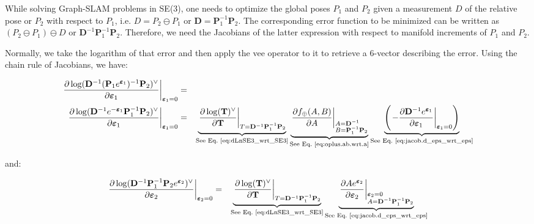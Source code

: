 \documentclass[a4paper,11pt]{report}
\newcommand{\E}{{\bm{\varepsilon}}}
\newcommand{\D}{{\mathbf{D}}}
\newcommand{\Pone}{\mathbf{P}_1}
\newcommand{\Ptwo}{\mathbf{P}_2}
\begin{document}
While solving Graph-SLAM problems in SE(3), one needs to optimize the global poses $P_1$ and $P_2$ given a measurement $D$ of the relative pose or $P_2$ with respect to $P_1$, i.e.  $D=P_2 \ominus P_1$ or $\D = \Pone^{-1} \Ptwo$.
The corresponding error function to be minimized can be written as $(P_2 \ominus P_1) \ominus D$ or $\D^{-1} \Pone^{-1} \Ptwo$.
Therefore, we need the Jacobians of the latter expression with respect to 
manifold increments of $P_1$ and $P_2$. 

Normally, we take the logarithm of that error and then apply the vee operator to it 
to retrieve a 6-vector describing the error. 
Using the chain rule of Jacobians, we have:

\begin{eqnarray}
\left. \frac{\partial \log( \D^{-1} (\Pone e^{\E_1} )^{-1} \Ptwo )^\vee}{\partial \E_1} \right|_{\E_1 = 0}
&=&
\nonumber \\
\left. \frac{\partial \log( \D^{-1} e^{-\E_1} \Pone^{-1} \Ptwo )^\vee}{\partial \E_1} \right|_{\E_1 = 0}
&=&
\underbrace{
\left.
 \frac{\partial \log(\mathbf{T})^\vee }{\partial \mathbf{T}}
\right|_{T=\D^{-1} \Pone^{-1} \Ptwo}
}_{\text{See Eq.~\ref{eq:dLnSE3_wrt_SE3}}}
%
\underbrace{
\left. \frac{\partial f_\oplus(A,B) }{\partial A } \right|_{\begin{subarray}{l} A=\D^{-1} \\ B=\Pone^{-1}\Ptwo \end{subarray}}
}_{\text{See Eq.~\ref{eq:oplus.ab.wrt.a}}}
%
\underbrace{
\left(
\left. - \frac{\partial \D^{-1} e^{\E_1} }{\partial \E_1} \right|_{\E_1 = 0}
\right)
}_{\text{See Eq.~\ref{eq:jacob.d_eps_wrt_eps}}}
%
\nonumber
\\
%
\end{eqnarray}

\noindent and:

\begin{eqnarray}
\left. \frac{\partial \log( \D^{-1} \Pone ^{-1} \Ptwo e^{\E_2} )^\vee}{\partial \E_2} \right|_{\E_2 = 0}
&=&
\underbrace{
\left.
 \frac{\partial \log(\mathbf{T})^\vee }{\partial \mathbf{T}}
\right|_{T=\D^{-1} \Pone^{-1} \Ptwo}
}_{\text{See Eq.~\ref{eq:dLnSE3_wrt_SE3}}}
%
\underbrace{
\left. \frac{\partial A e^{\E_2} }{\partial \E_2} \right|_{\begin{subarray}{l} \E_2=0\\ A= \D^{-1} \Pone ^{-1} \Ptwo\end{subarray}}
}_{\text{See Eq.~\ref{eq:jacob.d_eps_wrt_eps}}}
%
\nonumber
\\
%
\end{eqnarray}
\end{document}
